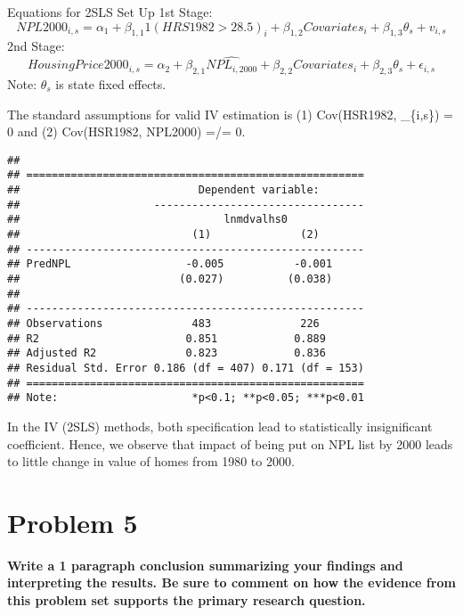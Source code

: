 \documentclass[
]{article}
\begin{document}
Equations for 2SLS Set Up 1st Stage: \[
NPL2000_{i,s} = \alpha_1 + \beta_{1,1} 1(HRS1982 > 28.5)_i + \beta_{1,2} Covariates_{i} + \beta_{1,3} \theta_s + v_{i,s} 
\] 2nd Stage: \[
HousingPrice2000_{i,s} = \alpha_2 + \beta_{2,1} \hat{NPL_{i,2000}} + \beta_{2,2} Covariates_{i} + \beta_{2,3} \theta_s + \epsilon_{i,s}
\] Note: \(\theta_s\) is state fixed effects.

The standard assumptions for valid IV estimation is (1) Cov(HSR1982,
\epsilon\_\{i,s\}) = 0 and (2) Cov(HSR1982, NPL2000) =/= 0.

\begin{verbatim}
## 
## =====================================================
##                            Dependent variable:       
##                     ---------------------------------
##                                lnmdvalhs0            
##                           (1)              (2)       
## -----------------------------------------------------
## PredNPL                  -0.005           -0.001     
##                         (0.027)          (0.038)     
##                                                      
## -----------------------------------------------------
## Observations              483              226       
## R2                       0.851            0.889      
## Adjusted R2              0.823            0.836      
## Residual Std. Error 0.186 (df = 407) 0.171 (df = 153)
## =====================================================
## Note:                     *p<0.1; **p<0.05; ***p<0.01
\end{verbatim}

In the IV (2SLS) methods, both specification lead to statistically
insignificant coefficient. Hence, we observe that impact of being put on
NPL list by 2000 leads to little change in value of homes from 1980 to
2000.

\newpage

\hypertarget{problem-5}{%
\section{Problem 5}\label{problem-5}}

\textbf{Write a 1 paragraph conclusion summarizing your findings and
interpreting the results. Be sure to comment on how the evidence from
this problem set supports the primary research question.}
\end{document}
